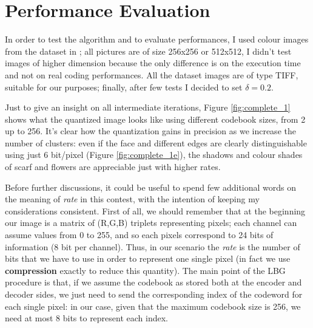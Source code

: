 \documentclass{report}
\begin{document}
\clearpage

\section{Performance Evaluation}
In order to test the algorithm and to evaluate performances, I used colour images from the dataset in \cite{SIPI}; all pictures are of size 256x256 or 512x512, I didn't test images of higher dimension because the only difference is on the execution time and not on real coding performances. All the dataset images are of type TIFF, suitable for our purposes; finally, after few tests I decided to set $\delta = 0.2$.

Just to give an insight on all intermediate iterations, Figure \ref{fig:complete_1} shows what the quantized image looks like using different codebook sizes, from 2 up to 256. It's clear how the quantization gains in precision as we increase the number of clusters: even if the face and different edges are clearly distinguishable using just 6 bit/pixel (Figure \ref{fig:complete_1e}), the shadows and colour shades of scarf and flowers are appreciable just with higher rates.

Before further discussions, it could be useful to spend few additional words on the meaning of \textit{rate} in this contest, with the intention of keeping my considerations consistent. First of all, we should remember that at the beginning our image is a matrix of (R,G,B) triplets representing pixels; each channel can assume values from 0 to 255, and so each pixels correspond to 24 bits of information (8 bit per channel). Thus, in our scenario the \textit{rate} is the number of bits that we have to use in order to represent one single pixel (in fact we use \textbf{compression} exactly to reduce this quantity). The main point of the LBG procedure is that, if we assume the codebook as stored both at the encoder and decoder sides, we just need to send the corresponding index of the codeword for each single pixel: in our case, given that the maximum codebook size is 256, we need at most 8 bits to represent each index. 
\end{document}
